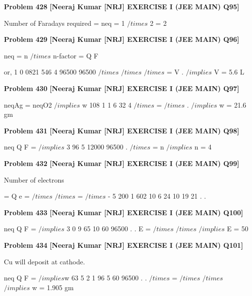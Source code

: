 \begin{problembox}
\textbf{Problem 428} \hfill \textbf{[Neeraj Kumar [NRJ] EXERCISE I (JEE MAIN) Q95]}
\label{q:ext-nrj_all_questions-428}

Number of Faradays required = neq = 1 $/times$ 2 = 2
\end{problembox}

\begin{problembox}
\textbf{Problem 429} \hfill \textbf{[Neeraj Kumar [NRJ] EXERCISE I (JEE MAIN) Q96]}
\label{q:ext-nrj_all_questions-429}

neq = n $/times$ n-factor = Q
F
 
 or, 
1
0 0821 546
4
96500
96500
$/times$
$/times$
$/times$
=
V
.
 $/implies$ V = 5.6 L
\end{problembox}

\begin{problembox}
\textbf{Problem 430} \hfill \textbf{[Neeraj Kumar [NRJ] EXERCISE I (JEE MAIN) Q97]}
\label{q:ext-nrj_all_questions-430}

neqAg = neqO2 $/implies$ w
108
1
1 6
32
4
$/times$ =
$/times$
.
 $/implies$ w = 21.6 gm
\end{problembox}

\begin{problembox}
\textbf{Problem 431} \hfill \textbf{[Neeraj Kumar [NRJ] EXERCISE I (JEE MAIN) Q98]}
\label{q:ext-nrj_all_questions-431}

neq
Q
F
=
 $/implies$ 
3
96 5
12000
96500
. $/times$
=
n
 $/implies$ n = 4
\end{problembox}

\begin{problembox}
\textbf{Problem 432} \hfill \textbf{[Neeraj Kumar [NRJ] EXERCISE I (JEE MAIN) Q99]}
\label{q:ext-nrj_all_questions-432}

Number  of electrons 
 
  
 
= Q
e =
$/times$
$/times$
=
$/times$
-
5
200
1 602
10
6 24
10
19
21
.
.
\end{problembox}

\begin{problembox}
\textbf{Problem 433} \hfill \textbf{[Neeraj Kumar [NRJ] EXERCISE I (JEE MAIN) Q100]}
\label{q:ext-nrj_all_questions-433}

neq
Q
F
=
 $/implies$ 3 0
9 65 10
60
96500
.
.
E =
$/times$
$/times$
 $/implies$ E = 50
\end{problembox}

\begin{problembox}
\textbf{Problem 434} \hfill \textbf{[Neeraj Kumar [NRJ] EXERCISE I (JEE MAIN) Q101]}
\label{q:ext-nrj_all_questions-434}

Cu will deposit at cathode.
 
 
neq
Q
F
=
$/implies$w
63 5
2
1 96 5
60
96500
.
.
$/times$
=
$/times$
$/times$
$/implies$ w = 1.905 gm
\end{problembox}

